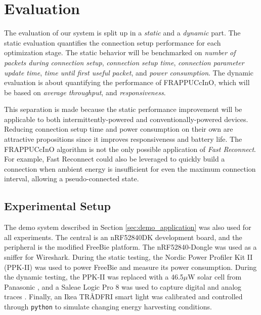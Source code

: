 \chapter{Evaluation}
\label{chp:chapter_4}
The evaluation of our system is split up in a \textit{static} and a \textit{dynamic} part. The static evaluation quantifies the connection setup performance for each optimization stage. The static behavior will be benchmarked on \textit{number of packets during connection setup}, \textit{connection setup time}, \textit{connection parameter update time}, \textit{time until first useful packet}, and \textit{power consumption}. The dynamic evaluation is about quantifying the performance of FRAPPUCcInO, which will be based on \textit{average throughput}, and \textit{responsiveness}.

This separation is made because the static performance improvement will be applicable to both intermittently-powered and conventionally-powered devices. Reducing connection setup time and power consumption on their own are attractive propositions since it improves responsiveness and battery life. The FRAPPUCcInO algorithm is not the only possible application of \textit{Fast Reconnect}. For example, Fast Reconnect could also be leveraged to quickly build a connection when ambient energy is insufficient for even the maximum connection interval, allowing a pseudo-connected state. 

\section{Experimental Setup}
\label{sec:evaluation_setup}
The demo system described in Section \ref{sec:demo_application} was also used for all experiments. The central is an nRF52840DK development board, and the peripheral is the modified FreeBie platform. The nRF52840-Dongle was used as a sniffer for Wireshark. During the static testing, the Nordic Power Profiler Kit II (PPK-II) was used to power FreeBie and measure its power consumption. During the dynamic testing, the PPK-II was replaced with a 46.5$\mu\text{W}$ solar cell from Panasonic \cite{panasonic_solar}, and a Saleae Logic Pro 8 was used to capture digital and analog traces \cite{saleae_logic_pro_8}. Finally, an Ikea TRÅDFRI smart light was calibrated and controlled through \texttt{python} to simulate changing energy harvesting conditions. 

